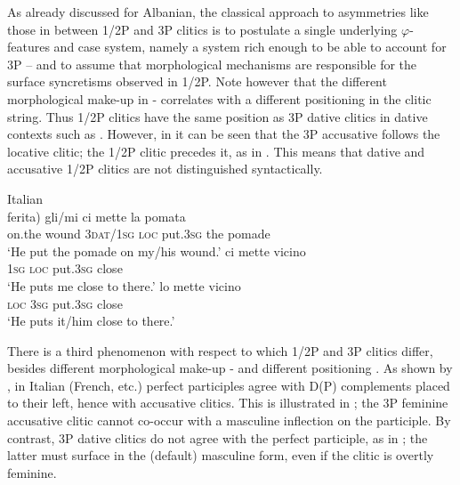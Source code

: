 \documentclass[output=paper,colorlinks,citecolor=brown,nonflat]{./langscibook}
\begin{document}
As already discussed for Albanian, the classical approach to asymmetries like those in  between 1/2P and 3P clitics is to postulate a single underlying $\varphi ${}-features and case system, namely a system rich enough to be able to account for 3P – and to assume that morphological mechanisms are responsible for the surface syncretisms observed in 1/2P. Note however that the different morphological make-up in - correlates with a different positioning in the clitic string. Thus 1/2P clitics have the same position as 3P dative clitics in dative contexts such as . However, in  it can be seen that the 3P accusative follows the locative clitic; the 1/2P clitic precedes it, as in . This means that dative and accusative 1/2P clitics are not distinguished syntactically.

\ea%
    \label{ex:manzini:13}
    Italian\\
    \ea\label{ex:manzini:13a} 
     {ferita)}   {gli/mi}    {ci}   {mette} {la} {pomata}\\
        on.the wound   \textsc{3dat/1sg}   \textsc{loc}   put.\textsc{3sg} the pomade\\
    \glt ‘He put the pomade on my/his wound.’
    \ex\label{ex:manzini:13b} 
      {ci}   {mette}   {vicino}\\
        \textsc{1sg}  \textsc{loc}  put.\textsc{3sg} close\\
    \glt ‘He puts me close to there.’
    \ex\label{ex:manzini:13c} 
      {lo}  {mette}   {vicino}\\
        \textsc{loc}  \textsc{3sg}   put.\textsc{3sg} close\\
    \glt ‘He puts it/him close to there.’
    \z
\z

There is a third phenomenon with respect to which 1/2P and 3P clitics differ, besides different morphological make-up - and different positioning . As shown by \citet{Kayne1989}, in Italian (French, etc.) perfect participles agree with D(P) complements placed to their left, hence with accusative clitics. This is illustrated in ; the 3P feminine accusative clitic cannot co-occur with a masculine inflection on the participle. By contrast, 3P dative clitics do not agree with the perfect participle, as in ; the latter must surface in the (default) masculine form, even if the clitic is overtly feminine.
\end{document}
